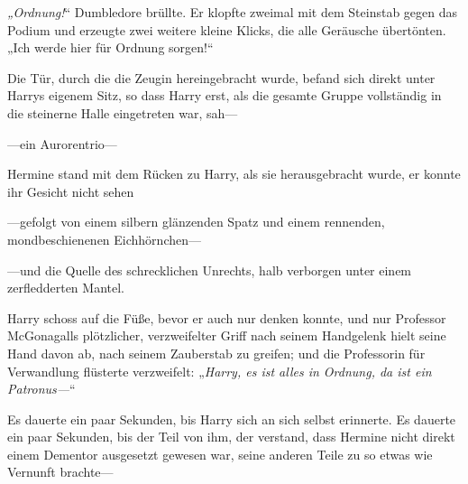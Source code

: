 \emph{„Ordnung!}“ Dumbledore brüllte. Er klopfte zweimal mit dem Steinstab gegen das Podium und erzeugte zwei weitere kleine Klicks, die alle Geräusche übertönten. „Ich werde hier für Ordnung sorgen!“

Die Tür, durch die die Zeugin hereingebracht wurde, befand sich direkt unter Harrys eigenem Sitz, so dass Harry erst, als die gesamte Gruppe vollständig in die steinerne Halle eingetreten war, sah—




—ein Aurorentrio—

Hermine stand mit dem Rücken zu Harry, als sie herausgebracht wurde, er konnte ihr Gesicht nicht sehen

—gefolgt von einem silbern glänzenden Spatz und einem rennenden, mondbeschienenen Eichhörnchen—

—und die Quelle des schrecklichen Unrechts, halb verborgen unter einem zerfledderten Mantel.

Harry schoss auf die Füße, bevor er auch nur denken konnte, und nur Professor McGonagalls plötzlicher, verzweifelter Griff nach seinem Handgelenk hielt seine Hand davon ab, nach seinem Zauberstab zu greifen; und die Professorin für Verwandlung flüsterte verzweifelt:
„\emph{Harry, es ist alles in Ordnung, da ist ein Patronus—}“

Es dauerte ein paar Sekunden, bis Harry sich an sich selbst erinnerte. Es dauerte ein paar Sekunden, bis der Teil von ihm, der verstand, dass Hermine nicht direkt einem Dementor ausgesetzt gewesen war, seine anderen Teile zu so etwas wie Vernunft brachte—

